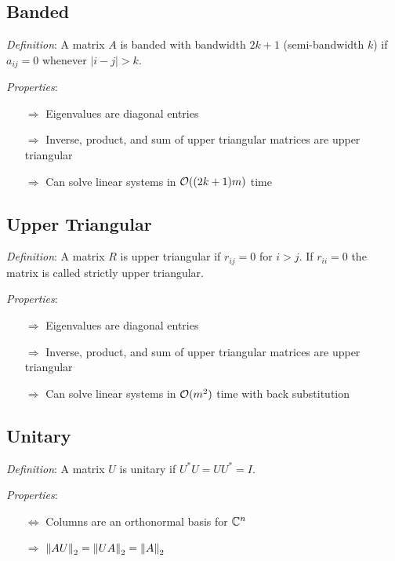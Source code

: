 \documentclass[12pt]{article}
\begin{document}
\subsection{Banded}
\textit{Definition}: A matrix \( A \) is banded with bandwidth \( 2k+1 \) (semi-bandwidth \( k \)) if \( a_{ij} = 0 \) whenever \( |i-j| > k \).

\textit{Properties}:
\begin{itemize}[nolistsep]
    \item[\(\Rightarrow\)] Eigenvalues are diagonal entries
    \item[\(\Rightarrow\)] Inverse, product, and sum of upper triangular matrices are upper triangular
    \item[\(\Rightarrow\)] Can solve linear systems in \( \mathcal{O}((2k+1)m) \) time
\end{itemize}



\subsection{Upper Triangular}
\textit{Definition}: A matrix \( R \) is upper triangular if \( r_{ij} = 0 \) for \( i>j \).
If \( r_{ii} = 0 \) the matrix is called strictly upper triangular. 

\textit{Properties}:
\begin{itemize}[nolistsep]
    \item[\(\Rightarrow\)] Eigenvalues are diagonal entries
    \item[\(\Rightarrow\)] Inverse, product, and sum of upper triangular matrices are upper triangular
    \item[\(\Rightarrow\)] Can solve linear systems in \( \mathcal{O}(m^2) \) time with back substitution
\end{itemize}


\subsection{Unitary}
\textit{Definition}: A matrix \( U \) is unitary if \( U^*U = UU^* = I  \).

\textit{Properties}:
\begin{itemize}[nolistsep]
    \item[\(\Leftrightarrow\)] Columns are an orthonormal basis for \( \mathbb{C}^n \)
    \item[\(\Rightarrow\)] \( \left\lVert AU\right\rVert_2 = \left\lVert UA\right\rVert_2 = \left\lVert A\right\rVert_2 \)
\end{itemize}
\end{document}
